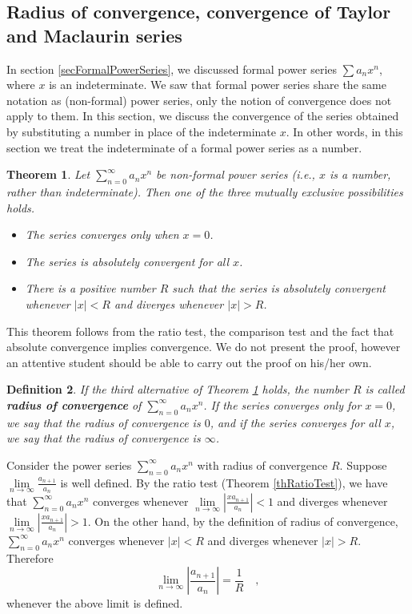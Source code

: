 \documentclass[12pt]{book}
\newtheorem{theorem}{Theorem}[section]
\newtheorem{definition}[theorem]{Definition}
\renewcommand{\emph}{\textbf}
\begin{document}
\subsection{Radius of convergence, convergence of Taylor and Maclaurin series}\label{secTaylorSeriesRadiusConvergence}
In section \ref{secFormalPowerSeries}, we discussed formal power series $\sum a_n x^n$, where $x$ is an indeterminate. We saw that formal power series share the same notation as (non-formal) power series, only the notion of convergence does not apply to them. In this section, we discuss the convergence of the series obtained by substituting a number in place of the indeterminate $x$. In other words, in this section we treat the indeterminate of a formal power series as a number.

\begin{theorem}\label{thRadiusConvergence} Let $\sum\limits_{n=0}^\infty a_n x^n$ be non-formal power series (i.e., $x$ is a number, rather than indeterminate). Then one of the three mutually exclusive possibilities holds.
\begin{itemize}
\item The series converges only when $x=0$.
\item The series is absolutely convergent for all $x$.
\item There is a positive number $R$ such that the series is absolutely convergent whenever $|x|<R$ and diverges whenever $|x|>R$.
\end{itemize}
\end{theorem}
This theorem follows from the ratio test, the comparison test and the fact that absolute convergence implies convergence. We do not present the proof, however an attentive student should be able to carry out the proof on his/her own.

\begin{definition}\label{defRadiusConvergence} 
If the third alternative of Theorem \ref{thRadiusConvergence} holds, the number $R$ is called \emph{radius of convergence} of $\sum\limits_{n=0}^\infty a_n x^n$. If the series converges only for $x=0$, we say that the radius of convergence is $0$, and if the series converges for all $x$, we say that the radius of convergence is $\infty$.
\end{definition}

Consider the power series $\sum\limits_{n=0}^\infty a_n x^n$ with radius of convergence $R$.  Suppose $\lim\limits_{n\to\infty} \frac{a_{n+1}}{a_n}$ is well defined. By the ratio test (Theorem \ref{thRatioTest}), we have that  $\sum\limits_{n=0}^\infty a_n x^n$ converges whenever $\lim\limits_{n\to\infty} \left|\frac{xa_{n+1}}{a_n}\right|<1$ and diverges whenever $\lim\limits_{n\to\infty} \left|\frac{xa_{n+1}}{a_n}\right|>1$. On the other hand, by the definition of radius of convergence, $\sum\limits_{n=0}^\infty a_n x^n$ converges whenever $|x|<R$ and diverges whenever $|x|>R$. Therefore 
\[
\lim\limits_{n\to\infty} \left|\frac{a_{n+1}}{a_n}\right|=\frac{1}{R}\quad,
\]
whenever the above limit is defined.
 
\end{document}
